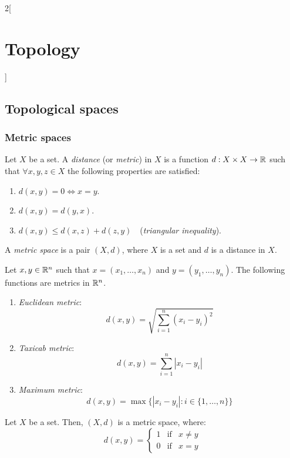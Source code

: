 \documentclass[../../../main.tex]{subfiles}
\begin{document}
\begin{multicols}{2}[\section{Topology}]
  \subsection{Topological spaces}
  \subsubsection{Metric spaces}
  \begin{definition}
    Let $X$ be a set. A \emph{distance} (or \emph{metric}) in $X$ is a function $d:X\times X\rightarrow\mathbb{R} $ such that $\forall x,y,z\in X$ the following properties are satisfied:
    \begin{enumerate}
      \item $d(x,y)=0\iff x=y$.
      \item $d(x,y)=d(y,x)$.
      \item $d(x,y)\leq d(x,z)+d(z,y)\quad$(\emph{triangular inequality}).
    \end{enumerate}
  \end{definition}
  \begin{definition}
    A \emph{metric space} is a pair $(X,d)$, where $X$ is a set and $d$ is a distance in $X$.
  \end{definition}
  \begin{prop}
    Let $x,y\in\mathbb{R}^n$ such that $x=(x_1,\ldots,x_n)$ and $y=(y_1,\ldots,y_n)$. The following functions are metrics in $\mathbb{R}^n$.
    \begin{enumerate}
      \item \emph{Euclidean metric}: $$d(x,y)=\sqrt{\sum_{i=1}^n{(x_i-y_i)}^2}$$
      \item \emph{Taxicab metric}: $$d(x,y)=\sum_{i=1}^n|x_i-y_i|$$
      \item \emph{Maximum metric}: $$d(x,y)=\max\{|x_i-y_i|:i\in\{1,\ldots,n\}\}$$
    \end{enumerate}
  \end{prop}
  \begin{prop}
    Let $X$ be a set. Then, $(X,d)$ is a metric space, where: $$d(x,y)=
      \left\{\begin{array}{lcc}
        1 & \text{if} & x\ne y \\
        0 & \text{if} & x= y
      \end{array}\right.
    $$

\end{prop}
\end{multicols}
\end{document}
